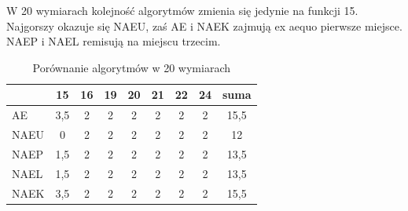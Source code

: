 \documentclass[12pt, a4paper]{article}
\begin{document}
W 20 wymiarach kolejność algorytmów zmienia się jedynie na funkcji 15. Najgorszy okazuje się
NAEU, zaś AE i NAEK zajmują ex aequo pierwsze miejsce. NAEP i NAEL remisują na miejscu trzecim.

\begin{table}[H]
\centering
\begin{tabular}{ l | c | c | c | c | c | c | c | c}
         & 15  & 16 & 19 & 20 & 21 & 22 & 24 & suma   \\ \hline
AE       & 3,5 & 2  & 2  & 2  & 2  & 2  & 2  & 15,5   \\ 
NAEU     & 0   & 2  & 2  & 2  & 2  & 2  & 2  & 12     \\ 
NAEP     & 1,5 & 2  & 2  & 2  & 2  & 2  & 2  & 13,5   \\ 
NAEL     & 1,5 & 2  & 2  & 2  & 2  & 2  & 2  & 13,5   \\
NAEK     & 3,5 & 2  & 2  & 2  & 2  & 2  & 2  & 15,5   \\ 
\end{tabular}
\caption{Porównanie algorytmów w 20 wymiarach}
\label{table:20d}
\end{table}
\end{document}
